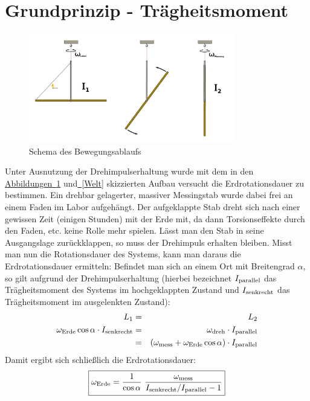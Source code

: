 \documentclass[11pt]{scrartcl}
\newcommand{\ltext}[1]{\ensuremath{_{\textnormal{#1}}}}
\newcommand{\hypref}[2]{\hyperref[#2]{{#1}~\ref{#2}}}
\begin{document}
\section{Grundprinzip - Tr\"agheitsmoment}\label{sec:grundprinzip}
\begin{figure}[th]
\begin{center}
\includegraphics[width=0.8\textwidth]{prinzip.pdf}
\end{center}
\vspace{-1.5\baselineskip}
\caption{Schema des Bewegungsablaufs}
\label{prinzip}
\end{figure}
Unter Ausnutzung der Drehimpulserhaltung wurde mit dem in den \hypref{Abbildungen}{prinzip} und\hypref{}{Welt} skizzierten Aufbau versucht die Erdrotationsdauer zu bestimmen. Ein drehbar gelagerter, massiver Messingstab wurde dabei frei an einem Faden im Labor aufgeh\"angt. Der aufgeklappte Stab dreht sich nach einer gewissen Zeit (einigen Stunden) mit der Erde mit, da dann Torsionseffekte durch den Faden, etc. keine Rolle mehr spielen. L\"asst man den Stab in seine Ausgangslage zur\"uckklappen, so muss der Drehimpuls erhalten bleiben. Misst man nun die Rotationsdauer des Systems, kann man daraus die Erdrotationsdauer ermitteln:
Befindet man sich an einem Ort mit Breitengrad $\alpha$, so gilt aufgrund der Drehimpulserhaltung (hierbei bezeichnet $I\ltext{parallel}$ das Tr\"agheitsmoment des Systems im hochgeklappten Zustand und $I\ltext{senkrecht}$ das Tr\"agheitsmoment im ausgelenkten Zustand):
\begin{eqnarray}
L_1 &=& L_2 \\
\omega\ltext{Erde}\cos\alpha \cdot I\ltext{senkrecht} &=&
\omega\ltext{dreh} \cdot I\ltext{parallel} \\
&=& (\omega\ltext{mess} + \omega\ltext{Erde}\cos\alpha) \cdot I\ltext{parallel}
\end{eqnarray}
Damit ergibt sich schließlich die Erdrotationsdauer:
\begin{equation}
\label{eq:grund}
\boxed{
\omega\ltext{Erde} =
\frac{1}{\cos\alpha}\ 
\frac{\omega\ltext{mess}}{I\ltext{senkrecht} / I\ltext{parallel} - 1}
}
\end{equation}
\end{document}
